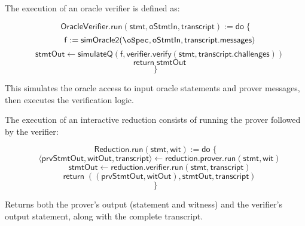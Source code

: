 \begin{definition}
    \label{def:oracle_verifier_run}
    The execution of an oracle verifier is defined as:

    \[ \mathsf{OracleVerifier}.\mathsf{run}(\mathsf{stmt}, \mathsf{oStmtIn}, \mathsf{transcript}) := \mathsf{do} \; \{ \]
    \[ \quad \mathsf{f} := \mathsf{simOracle2}(\oSpec, \mathsf{oStmtIn}, \mathsf{transcript}.\mathsf{messages}) \]
    \[ \quad \mathsf{stmtOut} \leftarrow \mathsf{simulateQ}(\mathsf{f}, \mathsf{verifier}.\mathsf{verify}(\mathsf{stmt}, \mathsf{transcript}.\mathsf{challenges})) \]
    \[ \quad \mathsf{return} \; \mathsf{stmtOut} \]
    \[ \} \]

    This simulates the oracle access to input oracle statements and prover messages, then executes the verification logic.
\end{definition}

\begin{definition}
    \label{def:reduction_run}
    The execution of an interactive reduction consists of running the prover followed by the verifier:

    \[ \mathsf{Reduction}.\mathsf{run}(\mathsf{stmt}, \mathsf{wit}) := \mathsf{do} \; \{ \]
    \[ \quad \langle \mathsf{prvStmtOut}, \mathsf{witOut}, \mathsf{transcript} \rangle \leftarrow \mathsf{reduction}.\mathsf{prover}.\mathsf{run}(\mathsf{stmt}, \mathsf{wit}) \]
    \[ \quad \mathsf{stmtOut} \leftarrow \mathsf{reduction}.\mathsf{verifier}.\mathsf{run}(\mathsf{stmt}, \mathsf{transcript}) \]
    \[ \quad \mathsf{return} \; ((\mathsf{prvStmtOut}, \mathsf{witOut}), \mathsf{stmtOut}, \mathsf{transcript}) \]
    \[ \} \]

    Returns both the prover's output (statement and witness) and the verifier's output statement, along with the complete transcript.
\end{definition}

